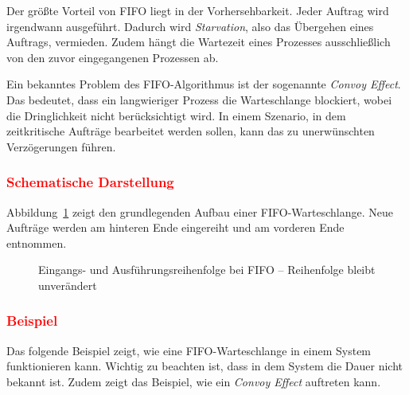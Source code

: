 \documentclass[
    12pt,               
    a4paper,            
    ngerman,            
    parskip=half,       
    headings=normal,   
    numbers=enddot,     
    toc=chapterentrywithdots 
]{scrreprt}\usepackage[utf8]{inputenc}
\begin{document}
Der größte Vorteil von FIFO liegt in der Vorhersehbarkeit. Jeder Auftrag wird irgendwann ausgeführt. Dadurch wird \textit{Starvation}, also das Übergehen eines Auftrags, vermieden. Zudem hängt die Wartezeit eines Prozesses ausschließlich von den zuvor eingegangenen Prozessen ab.

Ein bekanntes Problem des FIFO-Algorithmus ist der sogenannte \textit{Convoy Effect}. Das bedeutet, dass ein langwieriger Prozess die Warteschlange blockiert, wobei die Dringlichkeit nicht berücksichtigt wird. In einem Szenario, in dem zeitkritische Aufträge bearbeitet werden sollen, kann das zu unerwünschten Verzögerungen führen.

\subsubsection{\textcolor{red}{Schematische Darstellung}}
Abbildung~\ref{fig:fifo_queue} zeigt den grundlegenden Aufbau einer FIFO-Warteschlange. Neue Aufträge werden am hinteren Ende eingereiht und am vorderen Ende entnommen.

\begin{figure}[H]
\centering
{}
\caption{Eingangs- und Ausführungsreihenfolge bei FIFO -- Reihenfolge bleibt unverändert}
\label{fig:fifo_queue}
\end{figure}

\subsubsection{\textcolor{red}{Beispiel}}
Das folgende Beispiel zeigt, wie eine FIFO-Warteschlange in einem System funktionieren kann. Wichtig zu beachten ist, dass in dem System die Dauer nicht bekannt ist. Zudem zeigt das Beispiel, wie ein \textit{Convoy Effect} auftreten kann.
\end{document}
